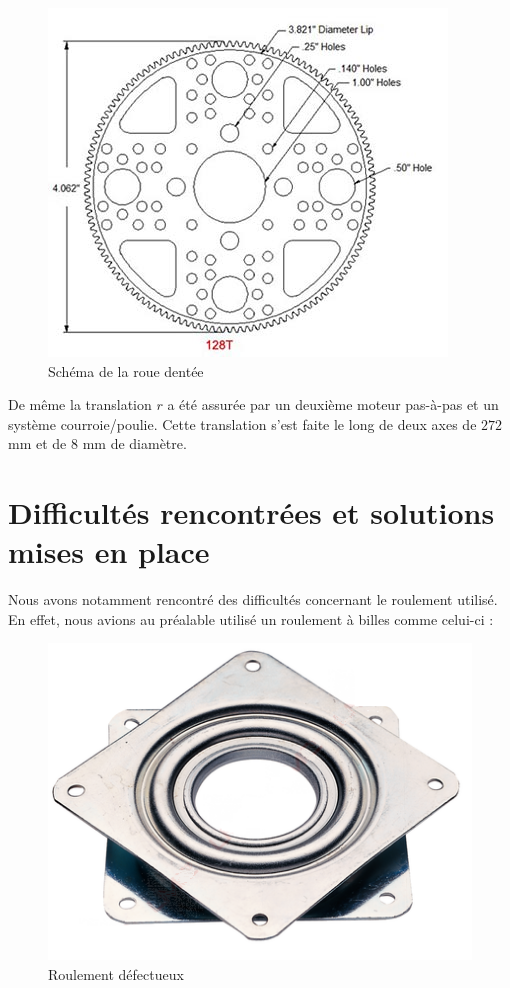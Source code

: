 \documentclass[12pt,a4paper]{report}
\begin{document}
\begin{figure}[!h]
 \center
 \includegraphics[scale=0.5]{../pictures/rouedentee2.jpg}
 \caption{Schéma de la roue dentée}
\end{figure}


De même la translation $r$ a été assurée par un deuxième moteur pas-à-pas et un système courroie/poulie. Cette translation s'est faite le long de deux axes de $272$ mm et de $8$ mm de diamètre.
	\section{Difficultés rencontrées et solutions mises en place}
	Nous avons notamment rencontré des difficultés concernant le roulement utilisé. En effet, nous avions au préalable utilisé un roulement à billes comme celui-ci :
	
	\begin{figure}[!h]
 \center
 \includegraphics[scale=0.5]{../pictures/roulementmerdique}
 \caption{Roulement défectueux}
\end{figure}
\end{document}
